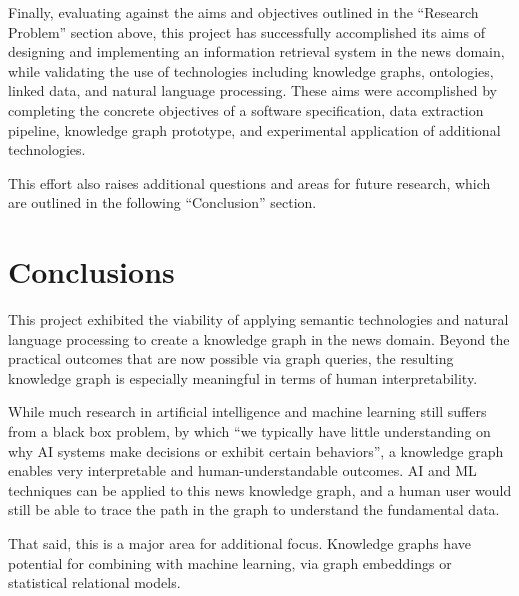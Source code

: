 \documentclass[11pt]{article}
\begin{document}
  Finally, evaluating against the aims and objectives outlined in the ``Research Problem'' section above, this project has successfully accomplished its aims of designing and implementing an information retrieval system in the news domain, while validating the use of technologies including knowledge graphs, ontologies, linked data, and natural language processing. These aims were accomplished by completing the concrete objectives of a software specification, data extraction pipeline, knowledge graph prototype, and experimental application of additional technologies.

  This effort also raises additional questions and areas for future research, which are outlined in the following ``Conclusion'' section.


\section{Conclusions}

This project exhibited the viability of applying semantic technologies and natural language processing to create a knowledge graph in the news domain. Beyond the practical outcomes that are now possible via graph queries, the resulting knowledge graph is especially meaningful in terms of human interpretability.

While much research in artificial intelligence and machine learning still suffers from a black box problem, by which ``we typically have little understanding on why AI systems make decisions or exhibit certain behaviors''\cite{rai2020explainable}, a knowledge graph enables very interpretable and human-understandable outcomes. AI and ML techniques can be applied to this news knowledge graph, and a human user would still be able to trace the path in the graph to understand the fundamental data.

That said, this is a major area for additional focus. Knowledge graphs have potential for combining with machine learning, via graph embeddings or statistical relational models\cite{wang2017knowledge}\cite{nickel2015review}.
\end{document}
